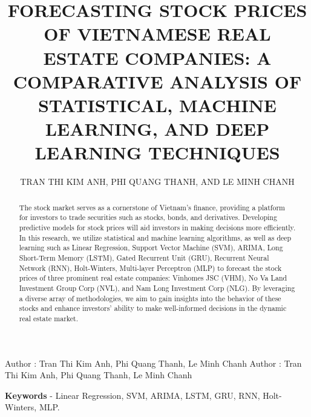 \documentclass{ieeeojies}
\begin{document}
	\title{FORECASTING STOCK PRICES OF VIETNAMESE REAL ESTATE COMPANIES: A COMPARATIVE ANALYSIS OF STATISTICAL, MACHINE LEARNING, AND DEEP LEARNING TECHNIQUES}
	
	\author{\uppercase{Tran Thi Kim Anh},
		\uppercase{Phi Quang Thanh, and Le Minh Chanh}}
	
	\address[1]{Faculty of Information Systems, University of Information Technology, (e-mail: 21520596@gm.uit.edu.vn)}
	\address[2]{Faculty of Information Systems, University of Information Technology, (e-mail: 21521449@gm.uit.edu.vn)}
	\address[3]{Faculty of Information Systems, University of Information Technology, (e-mail: 21521882@gm.uit.edu.vn)}
	
	\markboth
	{Author \headeretal: Tran Thi Kim Anh, Phi Quang Thanh, Le Minh Chanh}
	{Author \headeretal: Tran Thi Kim Anh, Phi Quang Thanh, Le Minh Chanh}
	
	\begin{abstract}
		The stock market serves as a cornerstone of Vietnam's finance, providing a platform for investors to trade securities such as stocks, bonds, and derivatives. Developing predictive models for stock prices will aid investors in making decisions more efficiently. In this research, we utilize statistical and machine learning algorithms, as well as deep learning such as Linear Regression, Support Vector Machine (SVM), ARIMA, Long Short-Term Memory (LSTM), Gated Recurrent Unit (GRU), Recurrent Neural Network (RNN), Holt-Winters, Multi-layer Perceptron (MLP) to forecast the stock prices of three prominent real estate companies: Vinhomes JSC (VHM), No Va Land Investment Group Corp (NVL), and Nam Long Investment Corp (NLG). By leveraging a diverse array of methodologies, we aim to gain insights into the behavior of these stocks and enhance investors' ability to make well-informed decisions in the dynamic real estate market.
	\end{abstract}
	
	\begin{keywords}
		\textbf{Keywords} - Linear Regression, SVM, ARIMA, LSTM, GRU, RNN, Holt-Winters, MLP.
	\end{keywords}
	
	\titlepgskip=-15pt
	
	\maketitle
\end{document}
